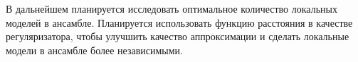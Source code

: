 \documentclass[12pt, twoside]{article}
\begin{document}
В дальнейшем планируется исследовать оптимальное количество локальных моделей в ансамбле. Планируется использовать функцию расстояния в качестве регуляризатора, чтобы улучшить качество аппроксимации и сделать локальные модели в ансамбле более независимыми.



\end{document}
